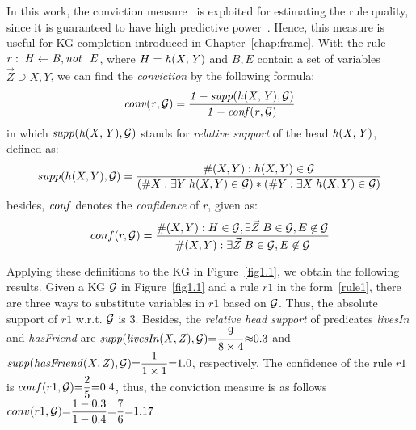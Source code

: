 In this work, the conviction measure~\cite{ref48} is exploited for estimating the rule quality, since it is guaranteed to have high predictive power~\cite{ref46}. Hence, this measure is useful for KG completion introduced in Chapter~\ref{chap:frame}. With the rule $r:\;\mi{H\leftarrow B, \naf\ E}$, where $H=\mathit{h(X,Y)}$ and $B,E$ contain a set of variables $\vec{Z}\supseteq X,Y$, we can find the \emph{conviction} by the following formula:
\vspace{-.26cm}
\begin{equation}
\mathit{conv(r, \mathcal{G})= \dfrac{1 - supp(h(X,Y), \mathcal{G})}{1 - conf(r, \mathcal{G})}}
\end{equation}
in which $\mathit{supp(h(X,Y),\mathcal{G})}$ stands for \textit{relative support} of the head $\mathit{h(X,Y)}$, defined as:
\vspace{-.28cm}
\begin{equation}
supp(h(X,Y),\mathcal{G})=\dfrac{\#(X,Y):h(X,Y)\in \mathcal{G}}{(\#X:\exists Y\;h(X,Y)\in \mathcal{G})*(\#Y:\exists X\;h(X,Y)\in \mathcal{G})}
\end{equation}
besides, $\mathit{conf}$ denotes the \textit{confidence} of $r$, given as:
\begin{equation}
conf(r,\mathcal{G})=\dfrac{\#(X,Y): H \in \mathcal{G}, \exists \vec{Z}\;B\in \mathcal{G},E \not \in \mathcal{G}}{\#(X,Y):\exists \vec{Z}\; B\in \mathcal{G}, E \not \in \mathcal{G}}
\end{equation}
\vspace{-.3cm}

\begin{example}
Applying these definitions to the KG in Figure~\ref{fig1.1}, we obtain the following results. Given a KG $\mathcal{G}$ in Figure~\ref{fig1.1} and a rule $r1$ in the form~\ref{rule1}, there are three ways to substitute variables in $r1$ based on $\mathcal{G}$. Thus, the absolute support of $r1$ w.r.t. $\mathcal{G}$ is $3$. Besides, the \textit{relative head support} of predicates \textit{livesIn} and \textit{hasFriend} are $\mathit{supp(livesIn(X,Z), \mathcal{G})}{=}\dfrac{9}{8 \times 4}{\approx} 0.3$ and  $\mathit{supp(hasFriend(X,Z), \mathcal{G})}{=}\dfrac{1}{1 \times 1}{=} 1.0$, respectively. The confidence of the rule $r1$ is $conf(r1, \mathcal{G}) {=} \dfrac{2}{5} {=} 0.4$, thus, the conviction measure is as follows $conv(r1, \mathcal{G}) {=} \dfrac{1-0.3}{1 - 0.4} {=} \dfrac{7}{6} {=} 1.17$
\end{example}